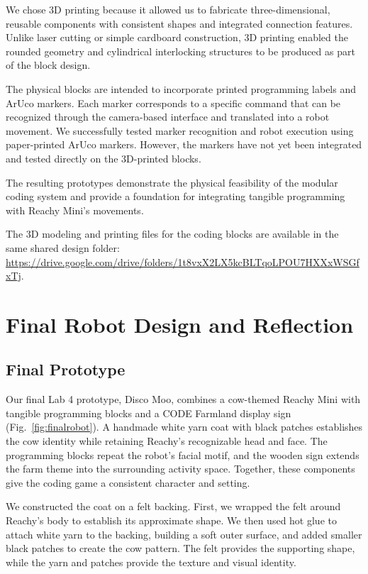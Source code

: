 \documentclass[conference]{IEEEtran}
\newcommand{\designfolder}{\url{https://drive.google.com/drive/folders/1t8vxX2LX5kcBLTqoLPOU7HXXxWSGfxTj}}
\begin{document}
We chose 3D printing because it allowed us to fabricate three-dimensional, reusable components with consistent shapes and integrated connection features. Unlike laser cutting or simple cardboard construction, 3D printing enabled the rounded geometry and cylindrical interlocking structures to be produced as part of the block design.

The physical blocks are intended to incorporate printed programming labels and ArUco markers. Each marker corresponds to a specific command that can be recognized through the camera-based interface and translated into a robot movement. We successfully tested marker recognition and robot execution using paper-printed ArUco markers. However, the markers have not yet been integrated and tested directly on the 3D-printed blocks.

The resulting prototypes demonstrate the physical feasibility of the modular coding system and provide a foundation for integrating tangible programming with Reachy Mini's movements.

The 3D modeling and printing files for the coding blocks are available in the same shared design folder: \designfolder.





\section{Final Robot Design and Reflection}
\label{sec:finaldesign}

\subsection{Final Prototype}

Our final Lab 4 prototype, Disco Moo, combines a cow-themed Reachy Mini with tangible programming blocks and a CODE Farmland display sign (Fig.~\ref{fig:finalrobot}). A handmade white yarn coat with black patches establishes the cow identity while retaining Reachy's recognizable head and face. The programming blocks repeat the robot's facial motif, and the wooden sign extends the farm theme into the surrounding activity space. Together, these components give the coding game a consistent character and setting.

We constructed the coat on a felt backing. First, we wrapped the felt around Reachy's body to establish its approximate shape. We then used hot glue to attach white yarn to the backing, building a soft outer surface, and added smaller black patches to create the cow pattern. The felt provides the supporting shape, while the yarn and patches provide the texture and visual identity.
\end{document}
